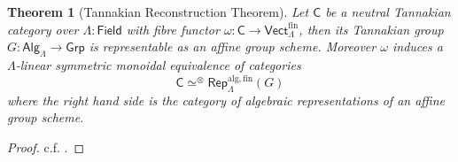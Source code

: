 \documentclass[11pt,letterpaper]{article}
\theoremstyle{numberfirstplain}
\newtheorem{theorem}{Theorem}[subsection]
\numberwithin{equation}{theorem}
\theoremstyle{numberfirstupright}
\begin{document}
\begin{theorem}[Tannakian Reconstruction Theorem]
  Let $\mathsf C$ be a neutral Tannakian category over $\Lambda:\mathsf{Field}$ with fibre functor $\omega:\mathsf{C}\rightarrow \mathsf{Vect}_\Lambda^{\mathrm{fin}}$, then its Tannakian group $G:\mathsf{Alg}_\Lambda\rightarrow\mathsf{Grp}$ is representable as an affine group scheme. Moreover $\omega$ induces a $\Lambda$-linear symmetric monoidal equivalence of categories
  $$\mathsf{C}\simeq^{\otimes}\mathsf{Rep}^{\mathrm{alg},\mathrm{fin}}_\Lambda(G)$$
  where the right hand side is the category of algebraic representations of an affine group scheme. 
\end{theorem}

\begin{proof}
c.f. \cite[Theorem~2.11]{DeligneMilne1982}.
\end{proof}


%
%


\newpage


\end{document}
